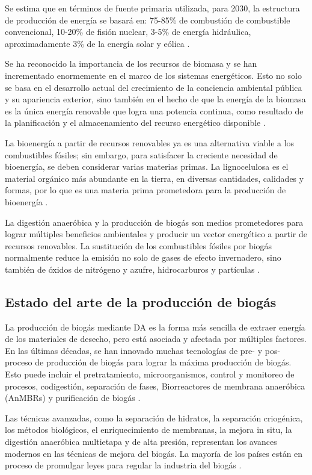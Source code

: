 \documentclass[a4paper,10pt]{article}
\begin{document}
Se estima que en términos de fuente primaria utilizada, para 2030, la estructura de producción de energía se basará en: 75-85\% de combustión de combustible convencional, 10-20\% de fisión nuclear, 3-5\% de energía hidráulica, aproximadamente 3\% de la energía solar y eólica \cite{Popescu2010}.

Se ha reconocido la importancia de los recursos de biomasa y se han incrementado enormemente en el marco de los sistemas energéticos. Esto no solo se basa en el desarrollo actual del crecimiento de la conciencia ambiental pública y su apariencia exterior, sino también en el hecho de que la energía de la biomasa es la única energía renovable que logra una potencia continua, como resultado de la planificación y el almacenamiento del recurso energético disponible \cite{Koenig2008}.

La bioenergía a partir de recursos renovables ya es una alternativa viable a los combustibles fósiles; sin embargo, para satisfacer la creciente necesidad de bioenergía, se deben considerar varias materias primas. La lignocelulosa es el material orgánico más abundante en la tierra, en diversas cantidades, calidades y formas, por lo que es una materia prima prometedora para la producción de bioenergía \cite{Petersson2007}.

La digestión anaeróbica y la producción de biogás son medios prometedores para lograr múltiples beneficios ambientales y producir un vector energético a partir de recursos renovables. La sustitución de los combustibles fósiles por biogás normalmente reduce la emisión no solo de gases de efecto invernadero, sino también de óxidos de nitrógeno y azufre, hidrocarburos y partículas \cite{Boerjesson2006}.

\subsection{Estado del arte de la producción de biogás}
La producción de biogás mediante DA es la forma más sencilla de extraer energía de los materiales de desecho, pero está asociada y afectada por múltiples factores. En las últimas décadas, se han innovado muchas tecnologías de pre- y pos- proceso de producción de biogás para lograr la máxima producción de biogás. Esto puede incluir el pretratamiento, microorganismos, control y monitoreo de procesos, codigestión, separación de fases, Biorreactores de membrana anaeróbica (AnMBRs) y purificación de biogás \cite{Maurya2019}.

Las técnicas avanzadas, como la separación de hidratos, la separación criogénica, los métodos biológicos, el enriquecimiento de membranas, la mejora in situ, la digestión anaeróbica multietapa y de alta presión, representan los avances modernos en las técnicas de mejora del biogás. La mayoría de los países están en proceso de promulgar leyes para regular la industria del biogás \cite{Korbag2020}.
\end{document}
